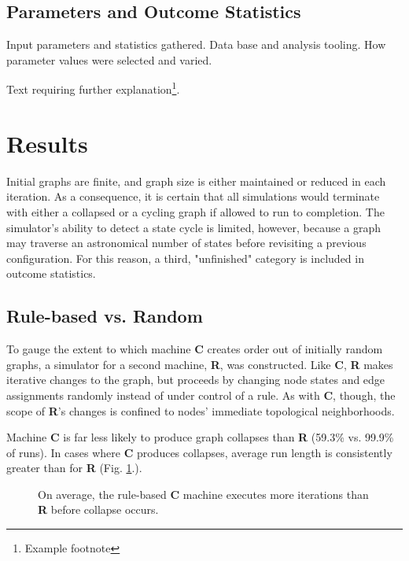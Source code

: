 \documentclass[twoside,twocolumn]{article}
\begin{document}
\subsection{Parameters and Outcome Statistics}

Input parameters and statistics gathered. Data base and analysis tooling.
How parameter values were selected and varied.

Text requiring further explanation\footnote{Example footnote}.


\section{Results}

Initial graphs are finite, and graph size is either maintained
or reduced in each iteration. As a consequence, it is certain that all
simulations
would terminate with either a collapsed or a cycling graph if allowed to
run to completion. The simulator's ability to detect a state cycle is
limited, however, because a graph may traverse an astronomical
number of states before revisiting a previous configuration.
For this reason, a third, "unfinished" category is included in
outcome statistics.

\subsection{Rule-based vs. Random}

To gauge the extent to which machine \textbf{C} creates order out of
initially random graphs, a simulator for a second machine, \textbf{R},
was constructed. Like \textbf{C}, \textbf{R} makes iterative changes to the
graph, but proceeds by changing node states and edge assignments randomly
instead of under control of a rule. As with \textbf{C}, though, the scope
of \textbf{R}'s changes is confined to nodes' immediate topological neighborhoods.

Machine \textbf{C} is far less likely to produce graph collapses than
\textbf{R} (59.3\% vs. 99.9\% of runs). In cases where \textbf{C} produces
collapses, average run length is consistently greater than
for \textbf{R} (Fig. \ref{fig:fig1}.).

\begin{figure}
  \caption{On average, the rule-based \textbf{C} machine executes more iterations than \textbf{R}  before collapse occurs.}
  \label{fig:fig1}
\end{figure}
\end{document}
